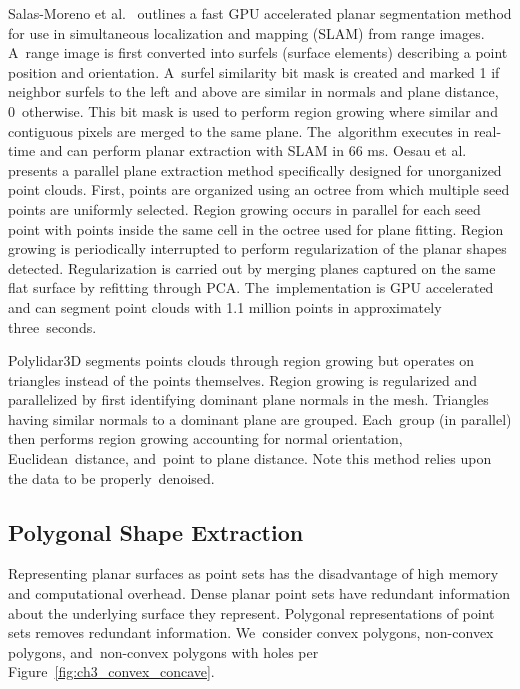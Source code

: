 Salas-Moreno et al.~\cite{salas-moreno_dense_2014} outlines a fast \ac{GPU} accelerated planar segmentation method for use in simultaneous localization and mapping (SLAM) from range images. A~range image is first converted into surfels (surface elements) describing a point position and orientation. A~surfel similarity bit mask is created and marked 1 if neighbor surfels to the left and above are similar in normals and plane distance, 0~otherwise.  This bit mask is used to perform region growing where similar and contiguous pixels are merged to the same plane. The~algorithm executes in real-time and can perform planar extraction with SLAM in 66 ms.
Oesau et al.~\cite{oesau_planar_2016} presents a parallel plane extraction method specifically designed for unorganized point clouds.  First, points are organized using an octree from which multiple seed points are uniformly selected. Region growing occurs in parallel for each seed point with points inside the same cell in the octree used for plane fitting. Region growing is periodically interrupted to perform regularization of the planar shapes detected. Regularization is carried out by merging planes captured on the same flat surface by refitting through PCA. The~implementation is \ac{GPU} accelerated and can segment point clouds with 1.1 million points in approximately three~seconds. 

Polylidar3D segments points clouds through region growing but operates on triangles instead of the points themselves. Region growing is regularized and parallelized by first identifying dominant plane normals in the mesh. Triangles having similar normals to a dominant plane are grouped. Each~group (in parallel) then performs region growing accounting for normal orientation, Euclidean~distance, and~point to plane distance. Note this method relies upon the data to be properly~denoised.



\subsection{Polygonal Shape Extraction}\label{sec:ch3_bg_shape_extraction}

Representing planar surfaces as point sets has the disadvantage of high memory and computational overhead.  Dense planar point sets have redundant information about the underlying surface they represent. Polygonal representations of point sets removes redundant information. We~consider convex polygons, non-convex polygons, and~non-convex polygons with holes per Figure~\ref{fig:ch3_convex_concave}.


